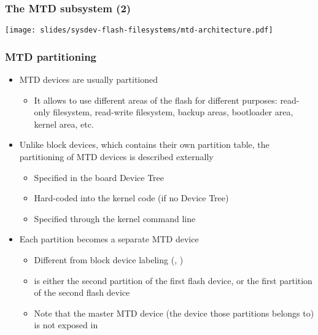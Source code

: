 \begin{frame}
  \frametitle{The MTD subsystem (2)}
  \begin{center}
    \texttt{[image: slides/sysdev-flash-filesystems/mtd-architecture.pdf]}
  \end{center}
\end{frame}

\begin{frame}
  \frametitle{MTD partitioning}
  \begin{itemize}
  \item MTD devices are usually partitioned
    \begin{itemize}
    \item It allows to use different areas of the flash for different
      purposes: read-only filesystem, read-write filesystem, backup
      areas, bootloader area, kernel area, etc.
    \end{itemize}
  \item Unlike block devices, which contains their own partition
    table, the partitioning of MTD devices is described externally
    \begin{itemize}
    \item Specified in the board Device Tree
    \item Hard-coded into the kernel code (if no Device Tree)
    \item Specified through the kernel command line
    \end{itemize}
  \item Each partition becomes a separate MTD device
    \begin{itemize}
    \item Different from block device labeling (,
      )
    \item {} is either the second partition of the first
      flash device, or the first partition of the second flash device
    \item Note that the master MTD device (the device those partitions
      belongs to) is not exposed in 
    \end{itemize}
  \end{itemize}
\end{frame}

